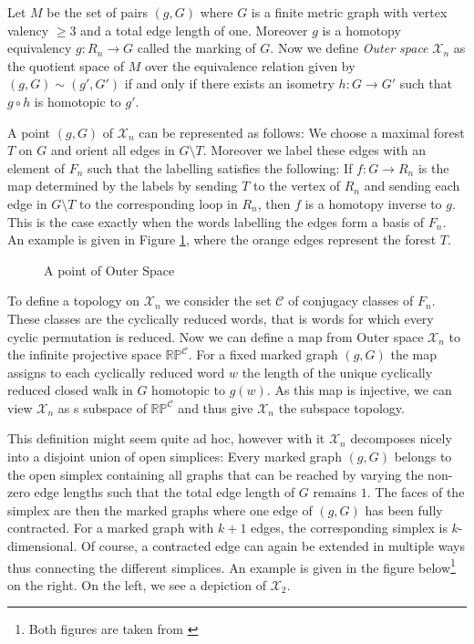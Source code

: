 \begin{definition}
Let $M$ be the set of pairs $(g,G)$ where $G$ is a finite metric graph with vertex valency $\geq 3$ and a total edge length of one.
Moreover $g$ is a homotopy equivalency $g: R_{n} \to G$ called the marking of $G$.
Now we define \emph{Outer space} $\mathcal{X}_{n}$ as the quotient space of $M$ over the equivalence relation given by $(g,G) \sim (g',G')$ if and only if 
there exists an isometry $h: G \to G'$ such that $g \circ h$ is homotopic to $g'$.
\end{definition}

A point $(g,G)$ of $\mathcal{X}_{n}$ can be represented as follows:
We choose a maximal forest $T$ on $G$ and orient all edges in $G \setminus T$.
Moreover we label these edges with an element of $F_{n}$ such that the labelling satisfies the following:
If $f: G \to R_{n}$ is the map determined by the labels by sending $T$ to the vertex of $R_{n}$ and sending
each edge in $G \setminus T$ to the corresponding loop in $R_{n}$, then $f$ is a homotopy inverse to $g$.
This is the case exactly when the words labelling the edges form a basis of $F_{n}$.
An example is given in Figure \ref{fig:pointOfXn}, where the orange edges represent the forest $T$.

\begin{figure}[ht]
	\centering
	\caption[skip=0pt]{A point of Outer Space}
	\label{fig:pointOfXn}
\end{figure}

To define a topology on $\mathcal{X}_{n}$ we consider the set $\mathcal{C}$ of conjugacy classes of $F_{n}$.
These classes are the cyclically reduced words, that is  words for which every cyclic permutation is reduced.
Now we can define a map from Outer space $\mathcal{X}_{n}$ to the infinite projective space $\mathbb{RP}^{\mathcal{C}}$.
For a fixed marked graph $(g,G)$ the map assigns to each cyclically reduced word $w$ the length
of the unique cyclically reduced closed walk in $G$ homotopic to $g(w)$.
As this map is injective, we can view $\mathcal{X}_{n}$ as s subspace of $\mathbb{RP}^{\mathcal{C}}$ and thus
give $\mathcal{X}_{n}$ the subspace topology.

This definition might seem quite ad hoc, however with it $\mathcal{X}_{n}$ decomposes nicely into
a disjoint union of open simplices: Every marked graph $(g,G)$ belongs to the open simplex
containing all graphs that can be reached by varying the non-zero edge lengths such that
the total edge length of $G$ remains $1$. The faces of the simplex are then the marked graphs where one edge of $(g,G)$
has been fully contracted. 
For a marked graph with $k+1$ edges, the corresponding simplex is $k$-dimensional.
Of course, a contracted edge can again be extended in multiple ways thus connecting
the different simplices. An example is given in the figure below\footnote{Both figures are taken from \cite{vogtmann02}} on the right.
On the left, we see a depiction of $\mathcal{X}_{2}$.

